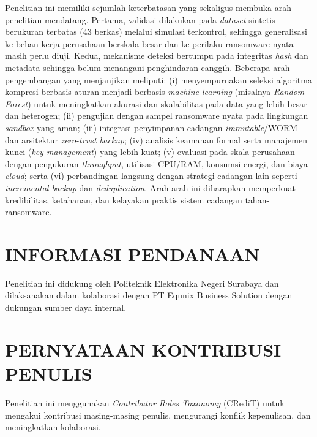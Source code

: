 \documentclass{iaesarticle}
\begin{document}
Penelitian ini memiliki sejumlah keterbatasan yang sekaligus membuka arah penelitian mendatang. Pertama, validasi dilakukan pada \textit{dataset} sintetis berukuran terbatas (43 berkas) melalui simulasi terkontrol, sehingga generalisasi ke beban kerja perusahaan berskala besar dan ke perilaku ransomware nyata masih perlu diuji. Kedua, mekanisme deteksi bertumpu pada integritas \textit{hash} dan metadata sehingga belum menangani penghindaran canggih. Beberapa arah pengembangan yang menjanjikan meliputi: (i) menyempurnakan seleksi algoritma kompresi berbasis aturan menjadi berbasis \textit{machine learning} (misalnya \textit{Random Forest}) untuk meningkatkan akurasi dan skalabilitas pada data yang lebih besar dan heterogen; (ii) pengujian dengan sampel ransomware nyata pada lingkungan \textit{sandbox} yang aman; (iii) integrasi penyimpanan cadangan \textit{immutable}/WORM dan arsitektur \textit{zero-trust backup}; (iv) analisis keamanan formal serta manajemen kunci (\textit{key management}) yang lebih kuat; (v) evaluasi pada skala perusahaan dengan pengukuran \textit{throughput}, utilisasi CPU/RAM, konsumsi energi, dan biaya \textit{cloud}; serta (vi) perbandingan langsung dengan strategi cadangan lain seperti \textit{incremental backup} dan \textit{deduplication}. Arah-arah ini diharapkan memperkuat kredibilitas, ketahanan, dan kelayakan praktis sistem cadangan tahan-ransomware.

\section*{INFORMASI PENDANAAN}
\label{sec:funding}
Penelitian ini didukung oleh Politeknik Elektronika Negeri Surabaya dan dilaksanakan dalam kolaborasi dengan PT Equnix Business Solution dengan dukungan sumber daya internal.

\section*{PERNYATAAN KONTRIBUSI PENULIS}
\label{sec:credit}
Penelitian ini menggunakan \textit{Contributor Roles Taxonomy} (CRediT) untuk mengakui kontribusi masing-masing penulis, mengurangi konflik kepenulisan, dan meningkatkan kolaborasi.
\end{document}
